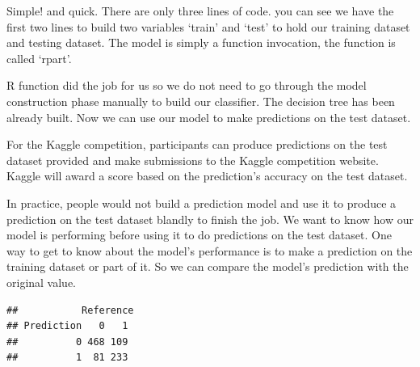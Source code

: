 \documentclass[
]{book}
\newenvironment{Shaded}{\begin{snugshade}}{\end{snugshade}}
\newcommand{\CommentTok}[1]{\textcolor[rgb]{0.56,0.35,0.01}{\textit{#1}}}
\newcommand{\DataTypeTok}[1]{\textcolor[rgb]{0.13,0.29,0.53}{#1}}
\newcommand{\DecValTok}[1]{\textcolor[rgb]{0.00,0.00,0.81}{#1}}
\newcommand{\KeywordTok}[1]{\textcolor[rgb]{0.13,0.29,0.53}{\textbf{#1}}}
\newcommand{\NormalTok}[1]{#1}
\newcommand{\OperatorTok}[1]{\textcolor[rgb]{0.81,0.36,0.00}{\textbf{#1}}}
\newcommand{\StringTok}[1]{\textcolor[rgb]{0.31,0.60,0.02}{#1}}
\begin{document}
Simple! and quick. There are only three lines of code. you can see we have the first two lines to build two variables `train' and `test' to hold our training dataset and testing dataset. The model is simply a function invocation, the function is called `rpart'.

R function did the job for us so we do not need to go through the model construction phase manually to build our classifier. The decision tree has been already built. Now we can use our model to make predictions on the test dataset.

For the Kaggle competition, participants can produce predictions on the test dataset provided and make submissions to the Kaggle competition website. Kaggle will award a score based on the prediction's accuracy on the test dataset.

In practice, people would not build a prediction model and use it to produce a prediction on the test dataset blandly to finish the job. We want to know how our model is performing before using it to do predictions on the test dataset. One way to get to know about the model's performance is to make a prediction on the training dataset or part of it. So we can compare the model's prediction with the original value.

\begin{Shaded}
\end{Shaded}

\begin{verbatim}
##           Reference
## Prediction   0   1
##          0 468 109
##          1  81 233
\end{verbatim}
\end{document}
